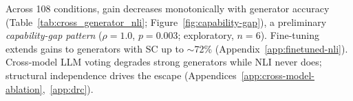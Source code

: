  Across 108 conditions, gain decreases monotonically with generator accuracy (Table~\ref{tab:cross_generator_nli}; Figure~\ref{fig:capability-gap}), a preliminary \emph{capability-gap pattern} ($\rho = 1.0$, $p = 0.003$; exploratory, $n{=}6$). Fine-tuning extends gains to generators with SC up to ${\sim}$72\% (Appendix~\ref{app:finetuned-nli}). Cross-model LLM voting degrades strong generators while NLI never does; structural independence drives the escape (Appendices~\ref{app:cross-model-ablation},~\ref{app:drc}).

